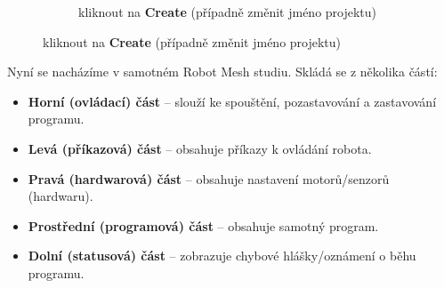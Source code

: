 \documentclass[main.tex]{subfiles}
\begin{document}
\begin{figure}[h!]
		\begin{subfigure}[t]{.3\textwidth}%
			\centering%
			\caption{kliknout na \textbf{Create} (případně změnit jméno projektu)}%
		\end{subfigure}%
	\end{figure}

	\newpage

	Nyní se nacházíme v samotném Robot Mesh studiu. Skládá se z několika částí:

	\begin{itemize}
		\item \textbf{Horní (ovládací) část} -- slouží ke spouštění, pozastavování a zastavování programu.
		\item \textbf{Levá (příkazová) část} -- obsahuje příkazy k ovládání robota.
		\item \textbf{Pravá (hardwarová) část} -- obsahuje nastavení motorů/senzorů (hardwaru).
		\item \textbf{Prostřední (programová) část} -- obsahuje samotný program.
		\item \textbf{Dolní (statusová) část} -- zobrazuje chybové hlášky/oznámení o běhu programu.
	\end{itemize}

	\begin{figure}[h!]
		\centering
	\end{figure}
\end{document}
